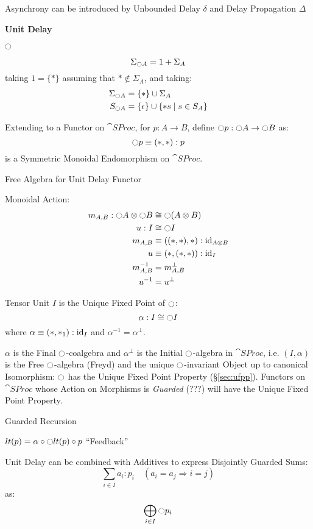 Asynchrony can be introduced by Unbounded Delay
$\delta$ and Delay Propagation $\Delta$


\textbf{Unit Delay}

$\ocircle$

\[
  \Sigma_{\ocircle A} = 1 + \Sigma_A
\]
taking $1 = \{*\}$ assuming that $* \notin \Sigma_A$, and taking:
\begin{align*}
  \Sigma_{\ocircle A} &= \{*\} \cup \Sigma_A \\
  S_{\ocircle A} &= \{\epsilon\} \cup \{*s \mid s \in S_A\}
\end{align*}

Extending to a Functor on $\cat{SProc}$, for $p : A \rightarrow B$,
define $\ocircle p : \ocircle A \rightarrow \ocircle B$ as:
\[
  \ocircle p \equiv (*,*):p
\]
is a Symmetric Monoidal Endomorphism on $\cat{SProc}$.

Free Algebra for Unit Delay Functor

Monoidal Action:
\begin{align*}
  m_{A,B} : \ocircle A \otimes \ocircle B
    &\cong \ocircle(A \otimes B) \\
  u : I &\cong \ocircle I \\
  m_{A,B} &\equiv ((*,*),*) : \mathrm{id}_{A \otimes B} \\
  u &\equiv (*,(*,*)) : \mathrm{id}_I \\
  m_{A,B}^{-1} &= m_{A,B}^\bot \\
  u^{-1} &= u^\bot
\end{align*}

Tensor Unit $I$ is the Unique Fixed Point of $\ocircle$:
\[
  \alpha : I \cong \ocircle I
\]
where $\alpha \equiv (*,*_1):\mathrm{id}_I$ and $\alpha^{-1} = \alpha^\bot$.

$\alpha$ is the Final $\ocircle$-coalgebra and $\alpha^\bot$ is the
Initial $\ocircle$-algebra in $\cat{SProc}$, i.e. $(I,\alpha)$ is the
Free $\ocircle$-algebra (Freyd) and the unique $\ocircle$-invariant
Object up to canonical Isomorphism: $\ocircle$ has the Unique Fixed
Point Property (\S\ref{sec:ufpp}). Functors on $\cat{SProc}$ whose
Action on Morphisms is \emph{Guarded} (???) will have the Unique
Fixed Point Property. %

Guarded Recursion

$lt(p) = \alpha \circ \ocircle lt(p) \circ p$ ``Feedback'' %

Unit Delay can be combined with Additives to express Disjointly
Guarded Sums:
\[
  \sum_{i \in I} a_i : p_i \quad (a_i = a_j \Rightarrow i = j)
\]
as:
\[
  \bigoplus_{i \in I} \ocircle p_i
\]


